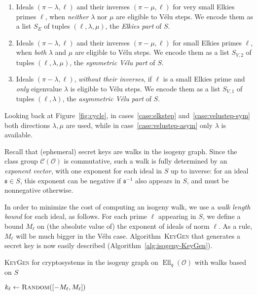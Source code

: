 \documentclass{llncs}
\newcommand{\Cl}{\mathcal{C}}
\renewcommand{\O}{\mathcal{O}}
\newcommand{\algstyle}[1]{\textsc{#1}}
\renewcommand{\frak}{\mathfrak}
\DeclareMathOperator{\Ell}{Ell}
\begin{document}
\begin{enumerate}
\item \label{case:elkstep} Ideals $(\pi - \lambda, \ell)$ and their inverses $(\pi - \mu, \ell)$
	for very small Elkies primes $\ell$, when \emph{neither} $\lambda$ nor $\mu$
	are eligible to Vélu steps. We encode them as 
	a list $S_E$ of tuples $(\ell, \lambda, \mu)$, the \emph{Elkies part} of $S$.
\item \label{case:velustep-sym} Ideals $(\pi - \lambda, \ell)$ and their inverses $(\pi - \mu, \ell)$
	for small Elkies primes $\ell$, when \emph{both} $\lambda$ and $\mu$
	are eligible to Vélu steps. We encode them as
	a list $S_{V, 2}$ of tuples $(\ell, \lambda, \mu)$, the \emph{symmetric Vélu part} of $S$.
\item \label{case:velustep-asym} Ideals $(\pi - \lambda, \ell)$, \emph{without their inverses},
	if $\ell$ is a small Elkies prime and \emph{only} eigenvalue $\lambda$
	is eligible to Vélu steps. We encode them as a list
	$S_{V, 1}$ of tuples $(\ell, \lambda)$, the \emph{asymmetric Vélu part} of $S$.
\end{enumerate}

Looking back at Figure~\ref{fig:cycle}, in cases~\ref{case:elkstep} and~\ref{case:velustep-sym}
both directions $\lambda,\mu$ are used, while in case~\ref{case:velustep-asym} only $\lambda$ is
available.

Recall that (ephemeral) secret keys are walks in the isogeny graph.
Since the class group $\Cl(\O)$ is commutative, such a walk is fully
determined by an \emph{exponent vector}, with one exponent for each ideal in $S$
up to inverse: for an ideal $\frak s\in S$, this exponent can be negative if
$\frak s^{-1}$ also appears in $S$, and must be nonnegative otherwise.

In order to minimize the cost of computing an isogeny walk, we use a
\emph{walk length bound} for each ideal, as follows.
For each prime $\ell$ appearing in $S$, we define a bound $M_\ell$
on (the absolute value of) the exponent of ideals of norm $\ell$. As a rule,
$M_\ell$ will be much bigger in the Vélu case.
Algorithm~\algstyle{KeyGen} that generates a secret key is now
easily described (Algorithm~\ref{alg:isogeny-KeyGen}).

\begin{algorithm}
    \caption{\algstyle{KeyGen} for cryptosystems in the isogeny graph on
    $\Ell_q(\O)$ with walks based on $S$}
    \label{alg:isogeny-KeyGen}
     {
        $k_\ell\gets \algstyle{Random}([-M_\ell, M_\ell])$ 
        \;
    }
    \For{$(\ell, \lambda)\in S_{V, 1}$}{%
        $k_\ell\gets \algstyle{Random}([0,M_\ell])$ 
        \;
    }
\end{algorithm}
\end{document}
